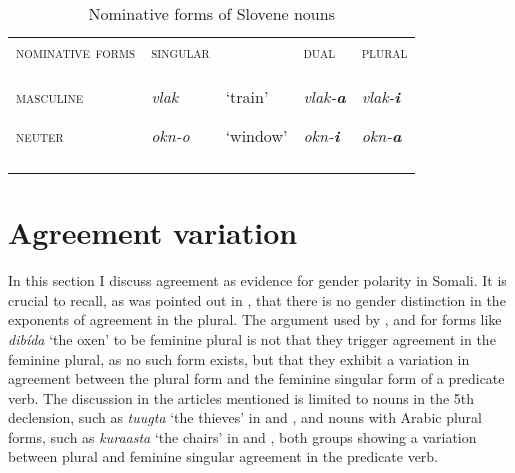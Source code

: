 \documentclass[output=paper]{langsci/langscibook}
\begin{document}
 
\begin{table}
\caption{Nominative forms of Slovene nouns}
\label{tab:8}
\begin{tabularx}{\textwidth}{XXXXX}
\lsptoprule
{\textsc{nominative forms}} & {\textsc{singular}} &  & {\textsc{dual}} & {\textsc{plural}}\\
{\textsc{masculine}}

{\textsc{neuter}} & {\textit{vlak}}

{\textit{okn-o}} & {‘train’}

{‘window’} & {\textit{vlak-}\textbf{\textit{a}}}

{\textit{okn-}\textbf{\textit{i}}} & {\textit{vlak-}\textbf{\textit{i}}}

{\textit{okn-}\textbf{\textit{a}}}\\
\lspbottomrule
\end{tabularx}

\end{table} 

\section{Agreement variation}

In this section I discuss agreement as evidence for gender polarity in Somali. It is crucial to recall, as was pointed out in , that there is no gender distinction in the exponents of agreement in the plural. The argument used by \citet{Hetzron1972}, \citet{ZwickyPullum1983} and \citet{Lecarme2002} for forms like \textit{dibída} ‘the oxen’ to be feminine plural is not that they trigger agreement in the feminine plural, as no such form exists, but that they exhibit a variation in agreement between the plural form and the feminine singular form of a predicate verb. The discussion in the articles mentioned is limited to nouns in the 5th declension, such as \textit{tuugta} ‘the thieves’ in  and , and nouns with Arabic plural forms, such as \textit{kuraasta} ‘the chairs’ in  and , both groups showing a variation between plural and feminine singular agreement in the predicate verb.
\end{document}
